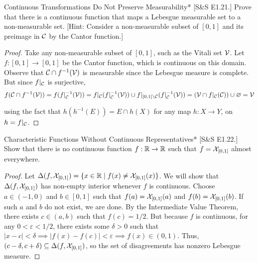 \begin{problem}{Continuous Transformations Do Not Preserve Measurability}*
    [S\&S E1.21.] Prove that there is a continuous function that maps a Lebesgue measurable set to a non-measurable set. [Hint: Consider a non-measurable subset of \([0,1]\) and its preimage in \(\mathcal{C}\) by the Cantor function.]
\end{problem}

\begin{proof}
    Take any non-measurable subset of \([0,1]\), such as the Vitali set \(\mathcal{V}\). Let \(f : [0,1] \to [0,1]\) be the Cantor function, which is continuous on this domain. Observe that \(\mathcal{C} \cap f^{-1}(\mathcal{V})\) is measurable since the Lebesgue measure is complete. But since \(f \vert_{\mathcal{C}}\) is surjective, 
    \[
    f(\mathcal{C} \cap f^{-1}(\mathcal{V}))
    = f(f\vert_{\mathcal{C}}^{-1}(\mathcal{V}))
    = f\vert_{\mathcal{C}}(f\vert_{\mathcal{C}}^{-1}(\mathcal{V})) \cup f\vert_{[0,1] \setminus \mathcal{C}} (f\vert_{\mathcal{C}}^{-1}(\mathcal{V}))
    = (\mathcal{V} \cap f\vert_{\mathcal{C}}(\mathcal{C})) \cup \varnothing
     = \mathcal{V}
    \]

    using the fact that \(h(h^{-1}(E)) = E \cap h(X)\) for any map \(h : X \to Y\), on \(h = f\vert_{\mathcal{C}}\). 
\end{proof}

\begin{problem}{Characteristic Functions Without Continuous Representatives}*
    [S\&S E1.22.] Show that there is no continuous function \(f : \mathbb{R} \to \mathbb{R}\) such that \(f = \mathcal{X}_{[0,1]}\) almost everywhere.
\end{problem}

\begin{proof}
    Let \(\Delta(f, \mathcal{X}_{[0,1]}) = \{x \in \mathbb{R} \mid f(x) \neq \mathcal{X}_{[0,1]}(x)\}\). We will show that \(\Delta(f, \mathcal{X}_{[0,1]})\) has non-empty interior whenever \(f\) is continuous. Choose \(a \in (-1,0)\) and \(b \in [0,1]\) such that \(f(a) = \mathcal{X}_{[0,1]}(a)\) and \(f(b) = \mathcal{X}_{[0,1]}(b)\). If such \(a\) and \(b\) do not exist, we are done. By the Intermediate Value Theorem, there exists \(c \in (a, b)\) such that \(f(c) = 1/2\). But because \(f\) is continuous, for any \(0 < \varepsilon < 1/2\), there exists some \(\delta > 0\) such that \(|x - c| < \delta \implies |f(x) - f(c)| < \varepsilon \implies f(x) \in (0, 1)\). Thus, \((c - \delta, c + \delta) \subseteq \Delta(f, \mathcal{X}_{[0,1]})\), so the set of disagreements has nonzero Lebesgue measure. 
\end{proof}

